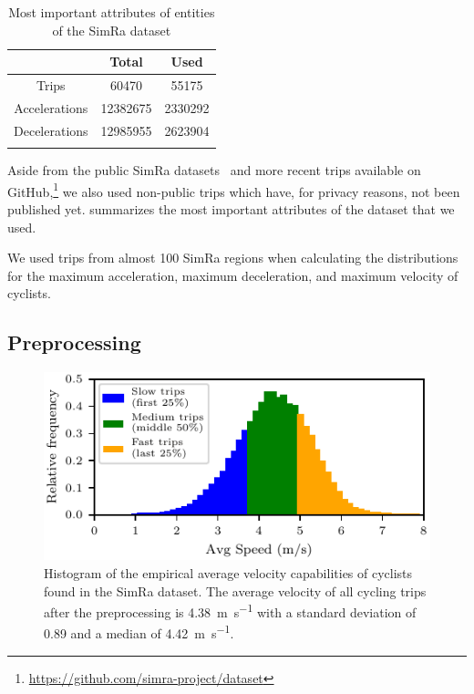 \begin{table}
\centering
\caption{Most important attributes of entities of the SimRa dataset}%
\label{tab:dataset}
\begin{tabular}{ccc}
\toprule
& Total & Used \\
\midrule
\midrule
Trips & \num{60470} & \num{55175} \\
Accelerations & \num{12382675} & \num{2330292} \\
Decelerations & \num{12985955} & \num{2623904} \\
\bottomrule&
\end{tabular}
\end{table}

Aside from the public SimRa datasets~\cite{dataset_simra_set1,dataset_simra_set2, dataset_simra_set3} and more recent trips available on GitHub,\footnote{\url{https://github.com/simra-project/dataset}} we also used non-public trips which have, for privacy reasons, not been published yet.
 summarizes the most important attributes of the dataset that we used.

We used trips from almost \num{100} SimRa regions when calculating the distributions for the maximum acceleration, maximum deceleration, and maximum velocity of cyclists.

\subsection{Preprocessing}
\label{subsec:preprocessing_sumo}
\begin{figure}[ht]
  \centering
    \includegraphics[width=0.7\columnwidth]{fig/analysis_avg_velo_all_trips.pdf}
    \caption{%
        Histogram of the empirical average velocity capabilities of cyclists found in the SimRa dataset. The average velocity of all cycling trips after the preprocessing is \SI{4.38}{\metre\per\second} with a standard deviation of \num{0.89} and a median of \SI{4.42}{\metre\per\second}.
    }%
    \label{fig:analysis_avg_vel_all}
\end{figure}

